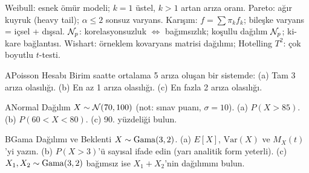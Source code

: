 \begin{mikroozet}
Weibull: esnek ömür modeli; $k=1$ üstel, $k>1$ artan arıza oranı.
Pareto: ağır kuyruk (heavy tail); $\alpha \leq 2$ sonsuz varyans.
Karışım: $f = \sum\pi_k f_k$; bileşke varyans = içsel + dışsal.
$\mathcal{N}_p$: korelasyonsuzluk $\iff$ bağımsızlık; koşullu dağılım $\mathcal{N}_p$; ki-kare bağlantısı.
Wishart: örneklem kovaryans matrisi dağılımı; Hotelling $T^2$: çok boyutlu $t$-testi.
\end{mikroozet}


\cozumlualistirmalar

\begin{alistirma}[Al.5.1]{A}{Poisson Hesabı}
Birim saatte ortalama 5 arıza oluşan bir sistemde:
(a) Tam 3 arıza olasılığı. (b) En az 1 arıza olasılığı. (c) En fazla 2 arıza olasılığı.
\end{alistirma}

\begin{alistirma}[Al.5.2]{A}{Normal Dağılım}
$X \sim \mathcal{N}(70, 100)$ (not: sınav puanı, $\sigma = 10$).
(a) $P(X > 85)$. (b) $P(60 < X < 80)$. (c) 90. yüzdeliği bulun.
\end{alistirma}

\begin{alistirma}[Al.5.3]{B}{Gama Dağılımı ve Beklenti}
$X \sim \operatorname{Gama}(3, 2)$.
(a) $E[X]$, $\mathrm{Var}(X)$ ve $M_X(t)$'yi yazın.
(b) $P(X > 3)$'ü sayısal ifade edin (yarı analitik form yeterli).
(c) $X_1, X_2 \sim \operatorname{Gama}(3, 2)$ bağımsız ise $X_1 + X_2$'nin dağılımını bulun.
\end{alistirma}

